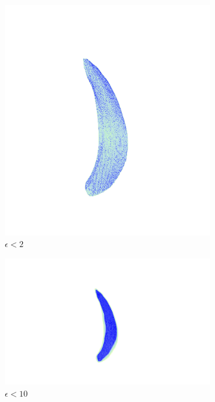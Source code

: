 \begin{figure}[ht]
  \centering
  \begin{subfigure}{.3 \linewidth}
  \centering
  \includegraphics[scale=0.2]{eps2.png}
  \caption{$\epsilon < 2$}
  \end{subfigure}%
  \begin{subfigure}{.3 \linewidth}
  \centering
  \includegraphics[scale=0.2]{eps10.png}
  \caption{$\epsilon < 10$}
  \end{subfigure}%
  \begin{subfigure}{.3 \linewidth}
  \centering

\end{subfigure}
\end{figure}
